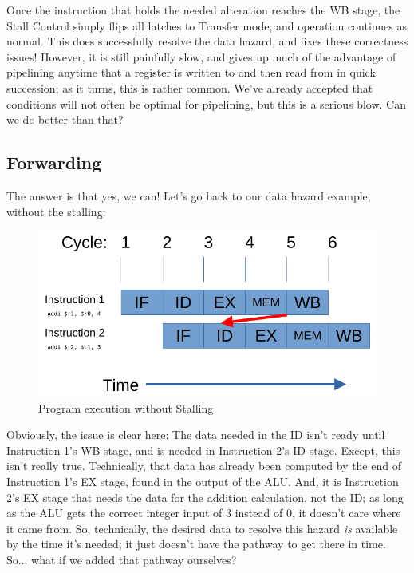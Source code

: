 \documentclass[12pt,twoside]{reedthesis}
\begin{document}
Once the instruction that holds the needed alteration reaches the WB stage, the Stall Control simply flips all latches to Transfer mode, and operation continues as normal. This does successfully resolve the data hazard, and fixes these correctness issues! However, it is still painfully slow, and gives up much of the advantage of pipelining anytime that a register is written to and then read from in quick succession; as it turns, this is rather common. We've already accepted that conditions will not often be optimal for pipelining, but this is a serious blow. Can we do better than that?

\subsection{Forwarding}

The answer is that yes, we can! Let's go back to our data hazard example, without the stalling:

\begin{figure}[h!]

	\centering
	\includegraphics[scale=0.9]{nostall}
	\caption{Program execution without Stalling}
	\label{no-stall}
\end{figure}

Obviously, the issue is clear here: The data needed in the ID isn't ready until Instruction 1's WB stage, and is needed in Instruction 2's ID stage. Except, this isn't really true. Technically, that data has already been computed by the end of Instruction 1's EX stage, found in the output of the ALU. And, it is Instruction 2's EX stage that needs the data for the addition calculation, not the ID; as long as the ALU gets the correct integer input of $3$ instead of $0$, it doesn't care where it came from. So, technically, the desired data to resolve this hazard \textit{is} available by the time it's needed; it just doesn't have the pathway to get there in time. So... what if we added that pathway ourselves?
\end{document}
